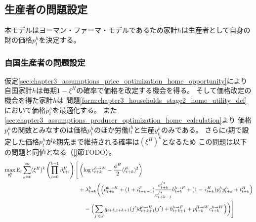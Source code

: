 
\subsection{生産者の問題設定}
\label{sec:chapter3_producers_problem_setup}
本モデルはヨーマン・ファーマ・モデルであるため家計\(h\)は生産者として自身の財の価格\(p_t^h\)を決定する。

\subsubsection{自国生産者の問題設定}
\label{sec:chapter3_producers_problem_setup_home}
仮定\ref{sec:chapter3_assumptions_price_optimization_home_opportunity}により
自国家計\(h\)は毎期\(1-\xi^H\)の確率で価格を改定する機会を得る。
そして価格改定の機会を得た家計\(h\)は
問題\ref{form:chapter3_households_stage2_home_utility_def}において価格\(p_t^h\)を最適化する。
また\ref{sec:chapter3_assumptions_producer_optimization_home_calculation}より
価格\(p_t^h\)の関数とみなすのは価格\(p_t^h\)のほか労働\(l_t^h\)と生産\(y_t^h\)のみである。
さらに\(t\)期で設定した価格\(p_t^h\)が\(k\)期先まで維持される確率は\((\xi^H)^k\)となるため
この問題は以下の問題と同値となる（\ref{}節TODO）。
\begin{equation}
\label{form:chapter3_producers_problem_setup_home_lagrangian_def}
    \begin{aligned}
        \max_{p_t^h}\operatorname{E}_t\sum_{k=0}^{\infty}(\xi^H)^k\left(\prod_{i=0}^{k-1}\beta_{t+i}^H\right)\Biggl[&\left(\log c_{t+k}^{h\to W}-\frac{\phi^H}{2}(l_{t+k}^h)^2\right) \\
        &+\lambda_{t+k}^h\biggl(\Bigl(d_{t+k}^{h\to H}+(1+i_{t+k-1}^F)\frac{e_{t+k}^{/*}}{e_{t+k-1}^{/*}}b_{t+k}^{h\to F}+(1-\tau_{t+k}^H)p_t^hy_{t+k}^h+t_{t+k}^H\Bigr) \\
        &\quad-\Bigl(\sum_{j'\in J}q_{t+k,t+k+1}(j')d_{t+k+1}^{h\to H}(j')+b_{t+k+1}^{h\to F}+p_{t+k}^{H\to W}c_{t+k}^{h\to W}\Bigr)\biggr)\Biggr]
    \end{aligned}
\end{equation}

